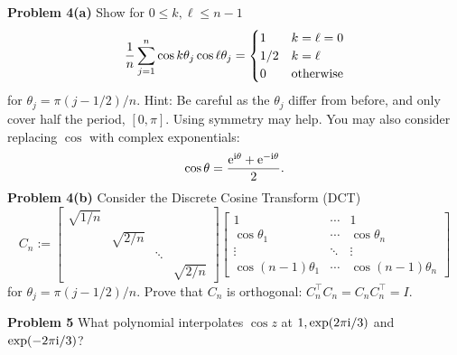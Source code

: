 \documentclass[12pt,a4paper]{article}
\begin{document}
\textbf{Problem 4(a)} Show for $0 \ensuremath{\leq} k,\ensuremath{\ell} \ensuremath{\leq} n-1$
\[
{1 \over n} \ensuremath{\sum}_{j=1}^n \cos k \ensuremath{\theta}_j \cos \ensuremath{\ell} \ensuremath{\theta}_j = \begin{cases} 1 & k = \ensuremath{\ell} = 0 \\
                                                  1/2 & k = \ensuremath{\ell} \\
                                                  0 & \hbox{otherwise}
                                                  \end{cases}
\]
for $\ensuremath{\theta}_j = \ensuremath{\pi}(j-1/2)/n$. Hint: Be careful as the $\ensuremath{\theta}_j$ differ from before, and only cover half the period, $[0,\ensuremath{\pi}]$. Using symmetry may help. You may also consider replacing $\cos$ with complex exponentials:
\[
\cos \ensuremath{\theta} = {{\rm e}^{{\rm i}\ensuremath{\theta}} + {\rm e}^{-{\rm i}\ensuremath{\theta}} \over 2}.
\]
\textbf{Problem 4(b)} Consider the Discrete Cosine Transform (DCT)
\[
C_n := \begin{bmatrix}
\sqrt{1/n} \\
 & \sqrt{2/n} \\
 && \ensuremath{\ddots} \\
 &&& \sqrt{2/n}
 \end{bmatrix}
\begin{bmatrix}
    1 & \ensuremath{\cdots} & 1\\
    \cos \ensuremath{\theta}_1 & \ensuremath{\cdots} & \cos \ensuremath{\theta}_n \\
    \ensuremath{\vdots} & \ensuremath{\ddots} & \ensuremath{\vdots} \\
    \cos (n-1)\ensuremath{\theta}_1 & \ensuremath{\cdots} & \cos (n-1)\ensuremath{\theta}_n
\end{bmatrix}
\]
for $\ensuremath{\theta}_j = \ensuremath{\pi}(j-1/2)/n$. Prove that $C_n$ is orthogonal: $C_n^\ensuremath{\top} C_n = C_n C_n^\ensuremath{\top} = I$.

\textbf{Problem 5} What polynomial interpolates $\cos z$ at $1, \exp(2\pi{\rm i}/3)$ and $\exp(-2\pi{\rm i}/3)$?
\end{document}
